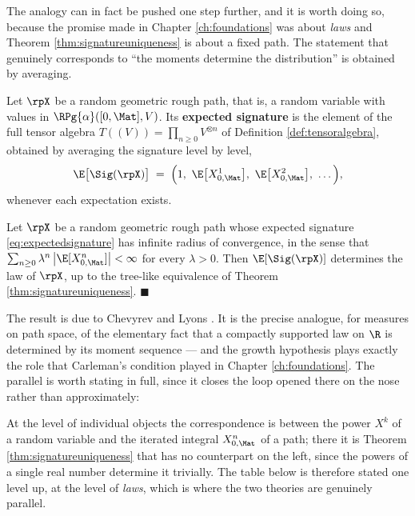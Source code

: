 The analogy can in fact be pushed one step further, and it is worth doing so, because the promise
made in Chapter \ref{ch:foundations} was about \emph{laws} and Theorem \ref{thm:signatureuniqueness} is
about a fixed path. The statement that genuinely corresponds to ``the moments determine the
distribution'' is obtained by averaging.

\begin{definition}\label{def:expectedsignature}
Let $\rpX$ be a random geometric rough path, that is, a random variable with values in
$\RPg{\alpha}([0,\Mat],V)$. Its \textbf{expected signature} is the element of the full tensor
algebra $T((V)) = \prod_{n\geq0}V^{\otimes n}$ of Definition \ref{def:tensoralgebra}, obtained by
averaging the signature level by level,
\begin{equation}\label{eq:expectedsignature}
\E\bigl[\Sig(\rpX)\bigr] \;=\; \Bigl(1,\ \E\bigl[X^1_{0,\Mat}\bigr],\ \E\bigl[X^2_{0,\Mat}\bigr],\ \dots\Bigr),
\end{equation}
whenever each expectation exists.
\end{definition}

\begin{theorem}\label{thm:expectedsignature}
Let $\rpX$ be a random geometric rough path whose expected signature \eqref{eq:expectedsignature}
has infinite radius of convergence, in the sense that
$\sum_{n\geq0}\lambda^{n}\,\bigl|\E[X^n_{0,\Mat}]\bigr| < \infty$ for every $\lambda>0$. Then
$\E[\Sig(\rpX)]$ determines the law of $\rpX$, up to the tree-like equivalence of Theorem
\ref{thm:signatureuniqueness}. \hfill $\blacksquare$
\end{theorem}

The result is due to Chevyrev and Lyons \cite{chevyrevlyons2016}. It is the precise analogue, for
measures on path space, of the elementary fact that a compactly supported law on $\R$ is determined
by its moment sequence --- and the growth hypothesis plays exactly the role that Carleman's condition
played in Chapter \ref{ch:foundations}. The parallel is worth stating in full, since it closes the loop
opened there on the nose rather than approximately:

At the level of individual objects the correspondence is between the power $X^k$ of a random
variable and the iterated integral $X^n_{0,\Mat}$ of a path; there it is Theorem
\ref{thm:signatureuniqueness} that has no counterpart on the left, since the powers of a single
real number determine it trivially. The table below is therefore stated one level up, at the level
of \emph{laws}, which is where the two theories are genuinely parallel.

